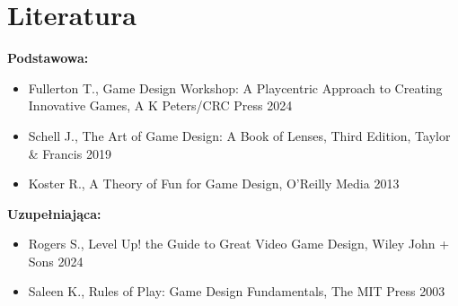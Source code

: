 \documentclass[12pt, a4paper]{article}
\begin{document}
\section{Literatura}

\textbf{Podstawowa:}
\begin{itemize}
  \item Fullerton T., Game Design Workshop: A Playcentric Approach to Creating Innovative Games, A K Peters/CRC Press 2024
  \item Schell J., The Art of Game Design: A Book of Lenses, Third Edition, Taylor \& Francis 2019
  \item Koster R., A Theory of Fun for Game Design, O'Reilly Media 2013
\end{itemize}

\textbf{Uzupełniająca:}
\begin{itemize}
  \item Rogers S., Level Up! the Guide to Great Video Game Design, Wiley John + Sons 2024
  \item Saleen K., Rules of Play: Game Design Fundamentals, The MIT Press 2003
\end{itemize}
\end{document}
